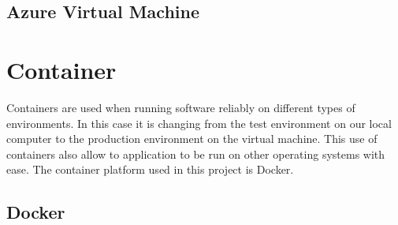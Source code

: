 \subsection{Azure Virtual Machine}

\section{Container}
Containers are used when running software reliably on different types of environments. In this case it is changing from the test environment on our local computer to the production environment on the virtual machine.  This use of containers also allow to application to be run on other operating systems with ease.  The container platform used in this project is Docker.

\subsection{Docker}
